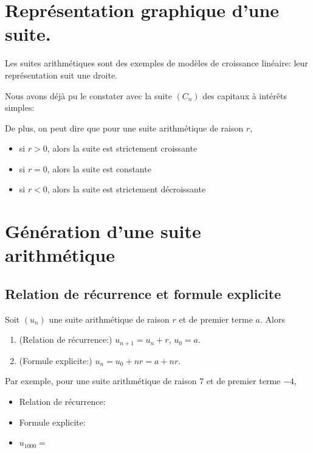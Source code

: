 \documentclass[a4paper,12pt]{report}
\begin{document}
\section{Représentation graphique d'une suite.}
\label{sec:org66915cf}
Les suites arithmétiques sont des exemples de modèles de croissance
linéaire: leur représentation suit une droite.

Nous avons déjà pu le constater avec la suite \((C_n)\) des capitaux à
intérêts simples:

\begin{center}

\end{center}

De plus, on peut dire que pour une suite arithmétique de raison \(r\),
\begin{itemize}
\item si \(r>0\), alors la suite est strictement croissante
\item si \(r=0\), alors la suite est constante
\item si \(r<0\), alors la suite est strictement décroissante
\end{itemize}

\section{Génération d'une suite arithmétique}
\label{sec:org320234c}

\subsection{Relation de récurrence et formule explicite}
\label{sec:org31de2e6}

\begin{propriete}
Soit \((u_n)\) une suite arithmétique de raison \(r\) et de premier terme \(a\). Alors

\begin{enumerate}
\item (Relation de récurrence:) \(u_{n+1}=u_{n}+r\), \(u_0=a\).
\item (Formule explicite:) \(u_n=u_0+nr=a+nr\).
\end{enumerate}
\end{propriete}

Par exemple, pour une suite arithmétique de raison 7 et de premier
terme \(-4\),

\begin{itemize}
\item Relation de récurrence: \dotfill

\item Formule explicite:\dotfill

\item \(u_{1000}=\) \dotfill
\end{itemize}
\end{document}

